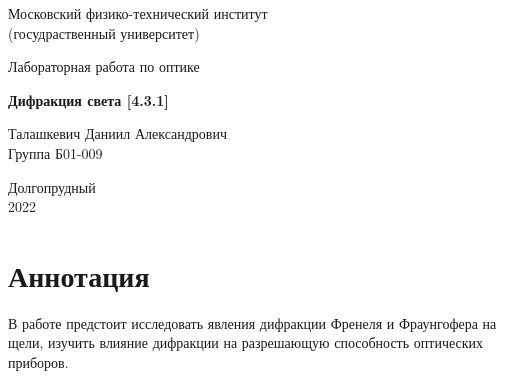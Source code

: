\documentclass[a4paper, 12pt]{article}%
\begin{document}


\begin{titlepage}

	\newpage
	\begin{center}
		\normalsize Московский физико-технический институт \\(госудраственный 			университет)
	\end{center}

	\vspace{6em}

	\begin{center}
		\Large Лабораторная работа по оптике\\
	\end{center}

	\vspace{1em}

	\begin{center}
		\large \textbf{Дифракция света [4.3.1]}
	\end{center}

	\vspace{2em}

	\begin{center}
		\large Талашкевич Даниил Александрович\\
		Группа Б01-009
	\end{center}

	\vspace{\fill}

	\begin{center}
	Долгопрудный \\2022
	\end{center}
	
\end{titlepage}



	\thispagestyle{empty}
	\newpage
	\tableofcontents
	\newpage
	\setcounter{page}{1}



\section{Аннотация}

В работе предстоит исследовать явления дифракции Френеля и Фраунгофера на щели, изучить влияние дифракции на разрешающую способность оптических приборов.
\end{document}
